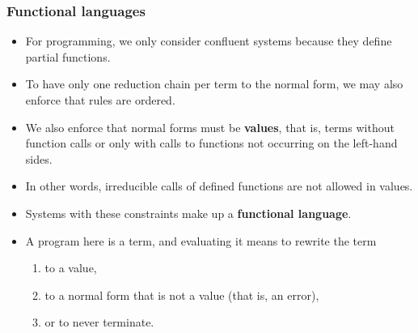 \documentclass[compress,dvips,xcolor={dvipsnames},t]{beamer}
\begin{document}
\begin{frame}
  \frametitle{Functional languages}

  \begin{itemize}

    \item For programming, we only consider confluent systems because
      they define partial functions.

    \item To have only one reduction chain per term to the normal
      form, we may also enforce that rules are ordered.

    \item We also enforce that normal forms must be \textbf{values},
      that is, terms without function calls or only with calls to
      functions not occurring on the left\hyp{}hand sides.

    \item In other words, irreducible calls of defined functions are
      not allowed in values.

    \item Systems with these constraints make up a \textbf{functional
      language}.

    \item A program here is a term, and evaluating it means to rewrite
      the term
      \begin{enumerate}
        \item to a value,
        \item to a normal form that is not a value (that is, an error),
        \item or to never terminate.
      \end{enumerate}

  \end{itemize}

\end{frame}
\end{document}
